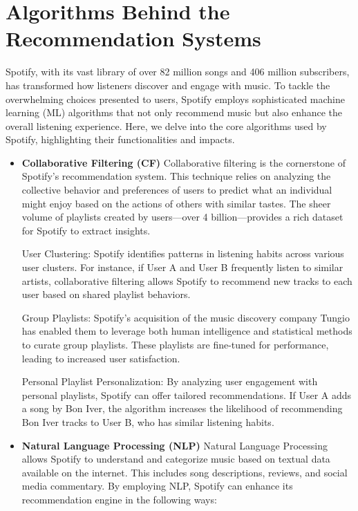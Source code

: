 \documentclass[12pt,a4paper]{article}
\begin{document}
\section{Algorithms Behind the Recommendation Systems}
Spotify, with its vast library of over 82 million songs and 406 million subscribers, has transformed how listeners discover and engage with music. To tackle the overwhelming choices presented to users, Spotify employs sophisticated machine learning (ML) algorithms that not only recommend music but also enhance the overall listening experience. Here, we delve into the core algorithms used by Spotify, highlighting their functionalities and impacts\citep{key}.
\begin{itemize}
 \item \textbf{Collaborative Filtering (CF)}
Collaborative filtering is the cornerstone of Spotify's recommendation system. This technique relies on analyzing the collective behavior and preferences of users to predict what an individual might enjoy based on the actions of others with similar tastes. The sheer volume of playlists created by users—over 4 billion—provides a rich dataset for Spotify to extract insights.

User Clustering: Spotify identifies patterns in listening habits across various user clusters. For instance, if User A and User B frequently listen to similar artists, collaborative filtering allows Spotify to recommend new tracks to each user based on shared playlist behaviors.

Group Playlists: Spotify's acquisition of the music discovery company Tungio has enabled them to leverage both human intelligence and statistical methods to curate group playlists. These playlists are fine-tuned for performance, leading to increased user satisfaction.

Personal Playlist Personalization: By analyzing user engagement with personal playlists, Spotify can offer tailored recommendations. If User A adds a song by Bon Iver, the algorithm increases the likelihood of recommending Bon Iver tracks to User B, who has similar listening habits\citep{key}.

 \item \textbf{Natural Language Processing (NLP)}
Natural Language Processing allows Spotify to understand and categorize music based on textual data available on the internet. This includes song descriptions, reviews, and social media commentary. By employing NLP, Spotify can enhance its recommendation engine in the following ways:


\end{itemize}
\end{document}
